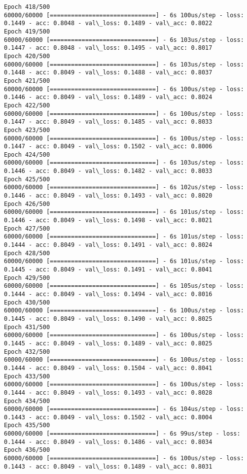 \documentclass[11pt]{article}
\begin{document}
\begin{Verbatim}[commandchars=\\\{\}]
Epoch 418/500
60000/60000 [==============================] - 6s 100us/step - loss: 0.1449 - acc: 0.8048 - val\_loss: 0.1489 - val\_acc: 0.8022
Epoch 419/500
60000/60000 [==============================] - 6s 103us/step - loss: 0.1447 - acc: 0.8048 - val\_loss: 0.1495 - val\_acc: 0.8017
Epoch 420/500
60000/60000 [==============================] - 6s 103us/step - loss: 0.1448 - acc: 0.8049 - val\_loss: 0.1488 - val\_acc: 0.8037
Epoch 421/500
60000/60000 [==============================] - 6s 100us/step - loss: 0.1446 - acc: 0.8049 - val\_loss: 0.1489 - val\_acc: 0.8024
Epoch 422/500
60000/60000 [==============================] - 6s 100us/step - loss: 0.1447 - acc: 0.8049 - val\_loss: 0.1485 - val\_acc: 0.8033
Epoch 423/500
60000/60000 [==============================] - 6s 100us/step - loss: 0.1447 - acc: 0.8049 - val\_loss: 0.1502 - val\_acc: 0.8006
Epoch 424/500
60000/60000 [==============================] - 6s 103us/step - loss: 0.1446 - acc: 0.8049 - val\_loss: 0.1482 - val\_acc: 0.8033
Epoch 425/500
60000/60000 [==============================] - 6s 102us/step - loss: 0.1446 - acc: 0.8049 - val\_loss: 0.1493 - val\_acc: 0.8020
Epoch 426/500
60000/60000 [==============================] - 6s 101us/step - loss: 0.1446 - acc: 0.8049 - val\_loss: 0.1498 - val\_acc: 0.8021
Epoch 427/500
60000/60000 [==============================] - 6s 101us/step - loss: 0.1444 - acc: 0.8049 - val\_loss: 0.1491 - val\_acc: 0.8024
Epoch 428/500
60000/60000 [==============================] - 6s 101us/step - loss: 0.1445 - acc: 0.8049 - val\_loss: 0.1491 - val\_acc: 0.8041
Epoch 429/500
60000/60000 [==============================] - 6s 105us/step - loss: 0.1444 - acc: 0.8049 - val\_loss: 0.1494 - val\_acc: 0.8016
Epoch 430/500
60000/60000 [==============================] - 6s 100us/step - loss: 0.1445 - acc: 0.8049 - val\_loss: 0.1490 - val\_acc: 0.8025
Epoch 431/500
60000/60000 [==============================] - 6s 100us/step - loss: 0.1445 - acc: 0.8049 - val\_loss: 0.1489 - val\_acc: 0.8025
Epoch 432/500
60000/60000 [==============================] - 6s 100us/step - loss: 0.1444 - acc: 0.8049 - val\_loss: 0.1504 - val\_acc: 0.8041
Epoch 433/500
60000/60000 [==============================] - 6s 100us/step - loss: 0.1444 - acc: 0.8049 - val\_loss: 0.1493 - val\_acc: 0.8028
Epoch 434/500
60000/60000 [==============================] - 6s 104us/step - loss: 0.1443 - acc: 0.8049 - val\_loss: 0.1502 - val\_acc: 0.8004
Epoch 435/500
60000/60000 [==============================] - 6s 99us/step - loss: 0.1444 - acc: 0.8049 - val\_loss: 0.1486 - val\_acc: 0.8034
Epoch 436/500
60000/60000 [==============================] - 6s 100us/step - loss: 0.1443 - acc: 0.8049 - val\_loss: 0.1489 - val\_acc: 0.8031

\end{Verbatim}
\end{document}
